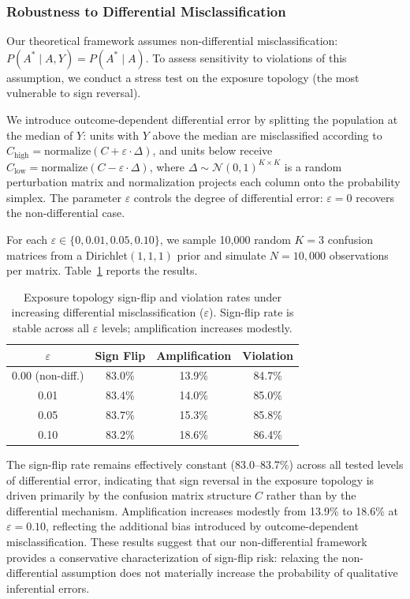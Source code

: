 \subsubsection{Robustness to Differential Misclassification}
\label{app:differential_stress}

Our theoretical framework assumes non-differential misclassification: $P(A^*{\mid}A, Y) = P(A^*{\mid}A)$. To assess sensitivity to violations of this assumption, we conduct a stress test on the exposure topology (the most vulnerable to sign reversal).

We introduce outcome-dependent differential error by splitting the population at the median of $Y$: units with $Y$ above the median are misclassified according to $C_{\text{high}} = \text{normalize}(C + \varepsilon \cdot \Delta)$, and units below receive $C_{\text{low}} = \text{normalize}(C - \varepsilon \cdot \Delta)$, where $\Delta \sim \mathcal{N}(0,1)^{K \times K}$ is a random perturbation matrix and normalization projects each column onto the probability simplex. The parameter $\varepsilon$ controls the degree of differential error: $\varepsilon{=}0$ recovers the non-differential case.

For each $\varepsilon \in \{0, 0.01, 0.05, 0.10\}$, we sample 10{,}000 random $K{=}3$ confusion matrices from a Dirichlet$(1,1,1)$ prior and simulate $N{=}10{,}000$ observations per matrix. Table~\ref{tab:differential_stress} reports the results.

\begin{table}[h]
\centering
\caption{Exposure topology sign-flip and violation rates under increasing differential misclassification ($\varepsilon$). Sign-flip rate is stable across all $\varepsilon$ levels; amplification increases modestly.}
\label{tab:differential_stress}
\small
\begin{tabular}{cccc}
\toprule
$\varepsilon$ & \textbf{Sign Flip} & \textbf{Amplification} & \textbf{Violation} \\
\midrule
0.00 (non-diff.) & 83.0\% & 13.9\% & 84.7\% \\
0.01 & 83.4\% & 14.0\% & 85.0\% \\
0.05 & 83.7\% & 15.3\% & 85.8\% \\
0.10 & 83.2\% & 18.6\% & 86.4\% \\
\bottomrule
\end{tabular}
\end{table}

The sign-flip rate remains effectively constant (83.0--83.7\%) across all tested levels of differential error, indicating that sign reversal in the exposure topology is driven primarily by the confusion matrix structure $C$ rather than by the differential mechanism. Amplification increases modestly from 13.9\% to 18.6\% at $\varepsilon{=}0.10$, reflecting the additional bias introduced by outcome-dependent misclassification. These results suggest that our non-differential framework provides a conservative characterization of sign-flip risk: relaxing the non-differential assumption does not materially increase the probability of qualitative inferential errors.
